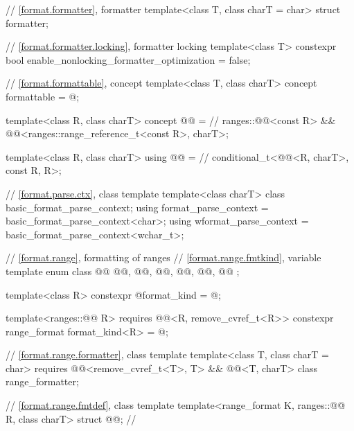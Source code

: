 \begin{codeblock}
{  // \ref{format.formatter}, formatter
  template<class T, class charT = char> struct formatter;

  // \ref{format.formatter.locking}, formatter locking
  template<class T>
    constexpr bool enable_nonlocking_formatter_optimization = false;

  // \ref{format.formattable}, concept 
  template<class T, class charT>
    concept formattable = @\seebelow@;

  template<class R, class charT>
    concept @@ =                                   // \expos
      ranges::@@<const R> &&
      @@<ranges::range_reference_t<const R>, charT>;

  template<class R, class charT>
    using @@ =                                             // \expos
      conditional_t<@@<R, charT>, const R, R>;

  // \ref{format.parse.ctx}, class template 
  template<class charT> class basic_format_parse_context;
  using format_parse_context = basic_format_parse_context<char>;
  using wformat_parse_context = basic_format_parse_context<wchar_t>;

  // \ref{format.range}, formatting of ranges
  // \ref{format.range.fmtkind}, variable template 
  enum class @@ {
    @@,
    @@,
    @@,
    @@,
    @@,
    @@
  };

  template<class R>
    constexpr @\unspec@ format_kind = @\unspec@;

  template<ranges::@@ R>
      requires @@<R, remove_cvref_t<R>>
    constexpr range_format format_kind<R> = @\seebelow@;

  // \ref{format.range.formatter}, class template 
  template<class T, class charT = char>
    requires @@<remove_cvref_t<T>, T> && @@<T, charT>
  class range_formatter;

  // \ref{format.range.fmtdef}, class template 
  template<range_format K, ranges::@@ R, class charT>
    struct @@;                                     // \expos

}
\end{codeblock}
